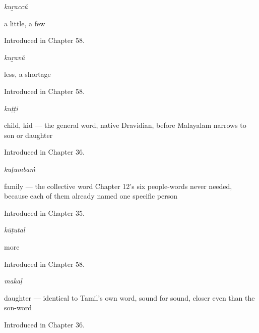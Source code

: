 \noindent\begin{minipage}[t]{\linewidth}
\raggedright
\textbf{}\enspace\emph{kuṟaccŭ}\par
\small a little, a few\par
\footnotesize Introduced in Chapter 58.
\end{minipage}\par\medskip

\noindent\begin{minipage}[t]{\linewidth}
\raggedright
\textbf{}\enspace\emph{kuṟavŭ}\par
\small less, a shortage\par
\footnotesize Introduced in Chapter 58.
\end{minipage}\par\medskip

\noindent\begin{minipage}[t]{\linewidth}
\raggedright
\textbf{}\enspace\emph{kuṭṭi}\par
\small child, kid — the general word, native Dravidian, before Malayalam narrows to son or daughter\par
\footnotesize Introduced in Chapter 36.
\end{minipage}\par\medskip

\noindent\begin{minipage}[t]{\linewidth}
\raggedright
\textbf{}\enspace\emph{kuṭumbaṁ}\par
\small family — the collective word Chapter 12's six people-words never needed, because each of them already named one specific person\par
\footnotesize Introduced in Chapter 35.
\end{minipage}\par\medskip

\noindent\begin{minipage}[t]{\linewidth}
\raggedright
\textbf{}\enspace\emph{kūṭutal}\par
\small more\par
\footnotesize Introduced in Chapter 58.
\end{minipage}\par\medskip

\noindent\begin{minipage}[t]{\linewidth}
\raggedright
\textbf{}\enspace\emph{makaḷ}\par
\small daughter — identical to Tamil's own word, sound for sound, closer even than the son-word\par
\footnotesize Introduced in Chapter 36.
\end{minipage}\par\medskip

